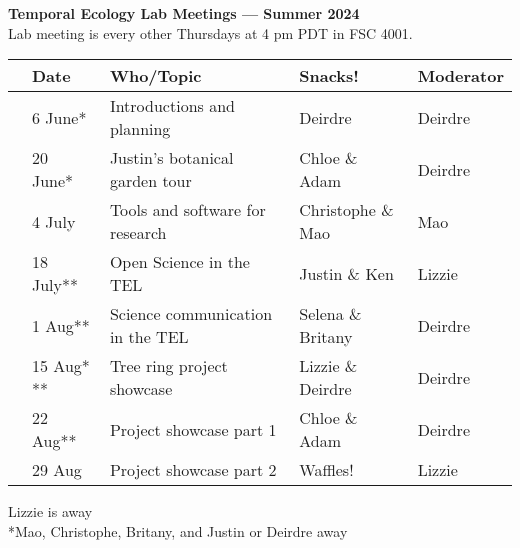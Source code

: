 \documentclass[11pt]{article}
\begin{document}
 
\raggedright
{}

\begin{center} 
{\large \textbf{Temporal Ecology Lab Meetings --- Summer 2024}} \\ [2pt]
Lab meeting is every other Thursdays at 4 pm PDT in FSC 4001.\\ %
\end{center} 

\begin{center}
\begin{tabular}{ p{0.2 cm}  p{2 cm}  p{5 cm}  p{3 cm}  p{3 cm} }  \hline \hline
 & \textbf{Date}
   & \textbf{Who/Topic}
      & \textbf{Snacks!} 
         & \textbf{Moderator} \\ 
\hline \hline
& 6 June* & Introductions and planning  &   Deirdre    & Deirdre\\\hline
& 20 June* &  Justin's botanical garden tour  &  Chloe \& Adam &  Deirdre \\\hline
& 4 July &  Tools and software for research & Christophe \& Mao &  Mao\\\hline  
& 18 July** &  Open Science in the TEL &  Justin \&  Ken &  Lizzie \\\hline
& 1 Aug**  & Science communication in the TEL &  Selena \& Britany &  Deirdre \\\hline 
& 15 Aug* ** &   Tree ring project showcase & Lizzie \& Deirdre &  Deirdre\\\hline
& 22 Aug** &   Project showcase part 1 & Chloe \& Adam &  Deirdre \\\hline
& 29 Aug &  Project showcase part 2 & Waffles! & Lizzie\\\hline 
\hline
\end{tabular}
\end{center}
\noindent *Lizzie is away \\
\noindent **Mao, Christophe, Britany, and Justin or Deirdre away
\end{document}
